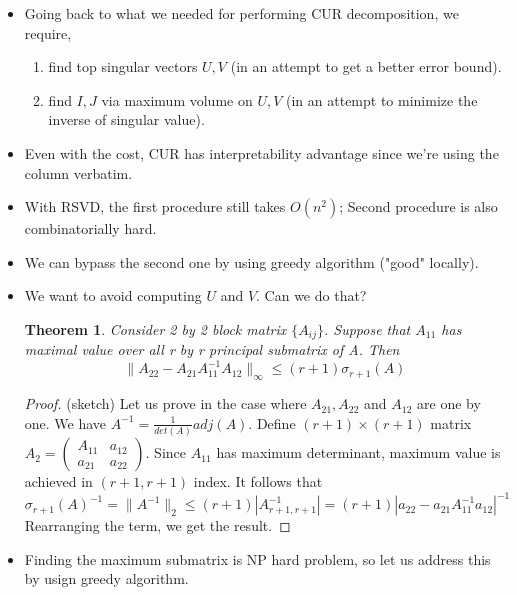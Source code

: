 \documentclass[11pt,reqno]{amsart}
\newtheorem{theorem}{Theorem}
\theoremstyle{remark}
\begin{document}
\begin{sloppypar}
\begin{itemize}
\begin{proof}
\end{proof}
\item Going back to what we needed for performing CUR decomposition, we require,
\begin{enumerate}
\item find top singular vectors $U,V$ (in an attempt to get a better error bound).
\item find $I,J$ via maximum volume on $U,V$ (in an attempt to minimize the inverse of singular value). 
\end{enumerate}
\item Even with the cost, CUR has interpretability advantage since we're using the column verbatim.
\item With RSVD, the first procedure still takes $O(n^2)$; Second procedure is also combinatorially hard.
\item We can bypass the second one by using greedy algorithm ("good" locally). 
\item We want to avoid computing $U$ and $V$. Can we do that?
\begin{theorem}
Consider 2 by 2 block matrix $\{A_{ij}\}$. Suppose that $A_{11}$ has maximal value over all
r by r principal submatrix of A. Then 
\[
\lVert A_{22}-A_{21}A_{11}^{-1}A_{12}\rVert_{\infty}\leq (r+1)\sigma_{r+1}(A)
\]
\end{theorem}
\begin{proof} (sketch)
Let us prove in the case where $A_{21}, A_{22}$ and $A_{12}$ are one by one.
We have $A^{-1}=\frac 1{det(A)}adj(A)$. Define $(r+1)\times(r+1)$ matrix
$A_2 = 
\begin{pmatrix}
A_{11} & a_{12}\\
a_{21} & a_{22}
\end{pmatrix}
$. Since $A_{11}$ has maximum determinant, maximum value is achieved in $(r+1,r+1)$ index. It follows that
\[
\sigma_{r+1}(A)^{-1}=\lVert A^{-1}\rVert_2\leq (r+1)|A^{-1}_{r+1,r+1}|=(r+1)|a_{22}-a_{21}A^{-1}_{11}a_{12}|^{-1}
\]
Rearranging the term, we get the result.
\end{proof}
\item Finding the maximum submatrix is NP hard problem, so let us address this by usign greedy algorithm.
\end{itemize}


\end{sloppypar}
\end{document}
